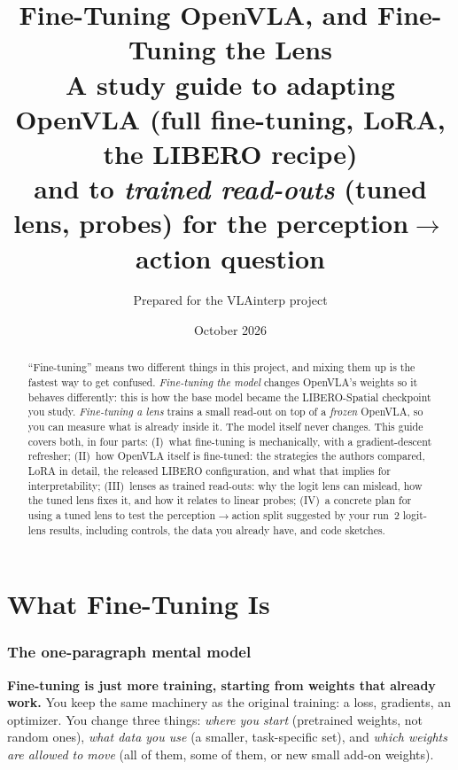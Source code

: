 \documentclass[11pt]{article}
\title{\textbf{Fine-Tuning OpenVLA, and Fine-Tuning the Lens}\\[4pt]
\large A study guide to adapting OpenVLA (full fine-tuning, LoRA, the LIBERO recipe)\\
and to \emph{trained read-outs} (tuned lens, probes) for the perception$\to$action question}
\author{Prepared for the VLAinterp project}
\date{October 2026}
\begin{document}
\maketitle
\thispagestyle{empty}

\begin{abstract}
\noindent ``Fine-tuning'' means two different things in this project, and mixing them up is the fastest way to get confused. \emph{Fine-tuning the model} changes OpenVLA's weights so it behaves differently: this is how the base model became the LIBERO-Spatial checkpoint you study. \emph{Fine-tuning a lens} trains a small read-out on top of a \emph{frozen} OpenVLA, so you can measure what is already inside it. The model itself never changes. This guide covers both, in four parts: (I)~what fine-tuning is mechanically, with a gradient-descent refresher; (II)~how OpenVLA itself is fine-tuned: the strategies the authors compared, LoRA in detail, the released LIBERO configuration, and what that implies for interpretability; (III)~lenses as trained read-outs: why the logit lens can mislead, how the tuned lens \cite{belrose2023tuned} fixes it, and how it relates to linear probes; (IV)~a concrete plan for using a tuned lens to test the perception$\to$action split suggested by your run~2 logit-lens results, including controls, the data you already have, and code sketches.
\end{abstract}

\tableofcontents
\newpage

\part{What Fine-Tuning Is}

\section{The one-paragraph mental model}

\begin{mental}
\textbf{Fine-tuning is just more training, starting from weights that already work.} You keep the same machinery as the original training: a loss, gradients, an optimizer. You change three things: \emph{where you start} (pretrained weights, not random ones), \emph{what data you use} (a smaller, task-specific set), and \emph{which weights are allowed to move} (all of them, some of them, or new small add-on weights).
\end{mental}
\end{document}
